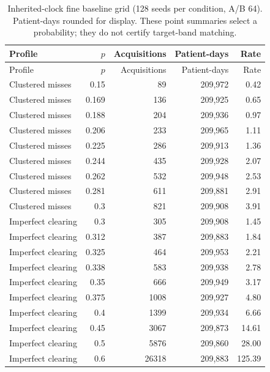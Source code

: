 \documentclass[11pt]{article}
\begin{document}
{\footnotesize\setlength{\tabcolsep}{3pt}
\begin{longtable}{lrrrr}
\caption{Inherited-clock fine baseline grid (128 seeds per condition, A/B 64). Patient-days rounded for display. These point summaries select a probability; they do not certify target-band matching.}\label{tab:clock-grid}\\
\toprule
Profile & $p$ & Acquisitions & Patient-days & Rate\\\midrule\endfirsthead
Profile & $p$ & Acquisitions & Patient-days & Rate\\\midrule\endhead
Clustered misses & 0.15 & 89 & 209,972 & 0.42\\
Clustered misses & 0.169 & 136 & 209,925 & 0.65\\
Clustered misses & 0.188 & 204 & 209,936 & 0.97\\
Clustered misses & 0.206 & 233 & 209,965 & 1.11\\
Clustered misses & 0.225 & 286 & 209,913 & 1.36\\
Clustered misses & 0.244 & 435 & 209,928 & 2.07\\
Clustered misses & 0.262 & 532 & 209,948 & 2.53\\
Clustered misses & 0.281 & 611 & 209,881 & 2.91\\
Clustered misses & 0.3 & 821 & 209,908 & 3.91\\
Imperfect clearing & 0.3 & 305 & 209,908 & 1.45\\
Imperfect clearing & 0.312 & 387 & 209,883 & 1.84\\
Imperfect clearing & 0.325 & 464 & 209,953 & 2.21\\
Imperfect clearing & 0.338 & 583 & 209,938 & 2.78\\
Imperfect clearing & 0.35 & 666 & 209,949 & 3.17\\
Imperfect clearing & 0.375 & 1008 & 209,927 & 4.80\\
Imperfect clearing & 0.4 & 1399 & 209,934 & 6.66\\
Imperfect clearing & 0.45 & 3067 & 209,873 & 14.61\\
Imperfect clearing & 0.5 & 5876 & 209,860 & 28.00\\
Imperfect clearing & 0.6 & 26318 & 209,883 & 125.39\\
\bottomrule\end{longtable}

}
\end{document}

